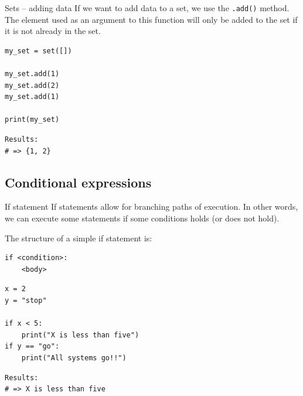 \documentclass[10pt]{beamer}
\begin{document}
\begin{frame}[label={sec:orgabdb2bb},fragile]{Sets -- adding data}
 If we want to add data to a set, we use the \texttt{.add()} method. The element used as an
argument to this function will only be added to the set if it is not already in the
set.

\begin{verbatim}
my_set = set([])

my_set.add(1)
my_set.add(2)
my_set.add(1)

print(my_set)
\end{verbatim}

\begin{verbatim}
Results: 
# => {1, 2}
\end{verbatim}
\end{frame}

\subsection{Conditional expressions}
\label{sec:org58ba7f4}
\begin{frame}[label={sec:orgadf82f8},fragile]{If statement}
 If statements allow for branching paths of execution. In other words, we can execute
some statements if some conditions holds (or does not hold).

The structure of a simple if statement is:

\begin{verbatim}
if <condition>:
    <body>
\end{verbatim}

\begin{verbatim}
x = 2
y = "stop"

if x < 5:
    print("X is less than five")
if y == "go":
    print("All systems go!!")
\end{verbatim}

\begin{verbatim}
Results: 
# => X is less than five
\end{verbatim}
\end{frame}
\end{document}
